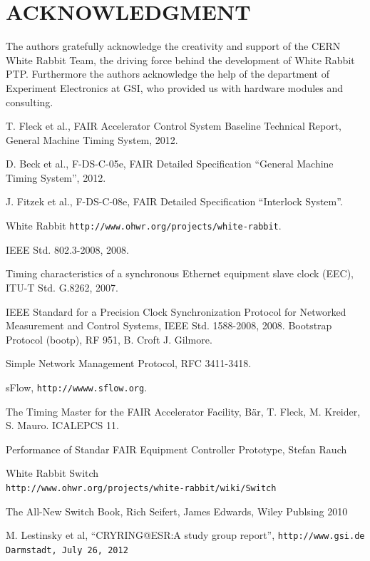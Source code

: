 \documentclass{JAC2003}
\begin{document}
\section{ACKNOWLEDGMENT}
The authors gratefully acknowledge the creativity and
support of the CERN White Rabbit Team, the driving force
behind the development of White Rabbit PTP. Furthermore
the authors acknowledge the help of the department of 
Experiment Electronics at GSI, who provided us with hardware modules and consulting.


\begin{thebibliography}{9}   %

 T. Fleck et al., FAIR Accelerator Control System Baseline
Technical Report, General Machine Timing System, 2012.

D. Beck et al., F-DS-C-05e, FAIR Detailed Specification
“General Machine Timing System”, 2012.

 J. Fitzek et al., F-DS-C-08e, FAIR Detailed Specification
“Interlock System”.

White Rabbit \texttt{http://www.ohwr.org/projects/white-rabbit}.

 IEEE Std. 802.3-2008, 2008.
 
Timing characteristics of a synchronous Ethernet equipment slave clock 
(EEC), ITU-T Std. G.8262, 2007.
 
IEEE Standard for a Precision Clock Synchronization Protocol for
  Networked Measurement and Control Systems, IEEE Std. 1588-2008,
  2008.
 Bootstrap Protocol (bootp), RF 951, B. Croft J. Gilmore.

 Simple Network Management Protocol, RFC 3411-3418.

 sFlow, \texttt{http://wwww.sflow.org}.

 The Timing Master for the FAIR Accelerator Facility, B{\"a}r, T.
Fleck, M. Kreider, S. Mauro. ICALEPCS 11.  

 Performance of Standar FAIR Equipment Controller Prototype, Stefan Rauch

White Rabbit Switch  \\
\texttt{http://www.ohwr.org/projects/white-rabbit/wiki/Switch}

 The All-New Switch Book, Rich Seifert, James Edwards, Wiley Publsing 2010

 M. Lestinsky et al, “CRYRING@ESR:A study group report”, \texttt{http://www.gsi.de Darmstadt, July 26, 2012}


\end{thebibliography}
\end{document}
